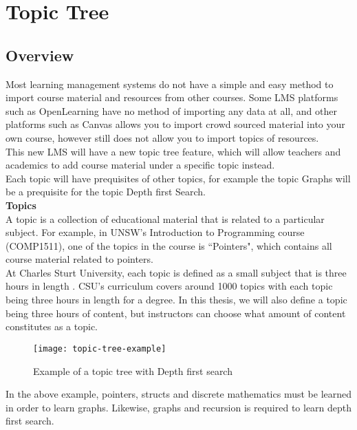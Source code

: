 \section{Topic Tree}
\subsection{Overview}
Most learning management systems do not have a simple and easy method to import course material and resources from other courses. Some LMS platforms such as OpenLearning have no method of importing any data at all, and other platforms such as Canvas allows you to import crowd sourced material into your own course, however still does not allow you to import topics of resources. \\

This new LMS will have a new topic tree feature, which will allow teachers and academics to add course material under a specific topic instead.\\
Each topic will have prequisites of other topics, for example the topic Graphs will be a prequisite for the topic Depth first Search.\\

\textbf{Topics} \\
A topic is a collection of educational material that is related to a particular subject. For example, in UNSW's Introduction to Programming course (COMP1511), one of the topics in the course is ``Pointers", which contains all course material related to pointers.\\

At Charles Sturt University, each topic is defined as a small subject that is three hours in length \cite{csutopictree}. CSU's curriculum covers around 1000 topics with each topic being three hours in length for a degree. In this thesis, we will also define a topic being three hours of content, but instructors can choose what amount of content constitutes as a topic.\\


\begin{figure}[h!]
    \centering
    \texttt{[image: topic-tree-example]}
    \caption{Example of a topic tree with Depth first search}
\end{figure}

In the above example, pointers, structs and discrete mathematics must be learned in order to learn graphs. Likewise, graphs and recursion is required to learn depth first search.\\


